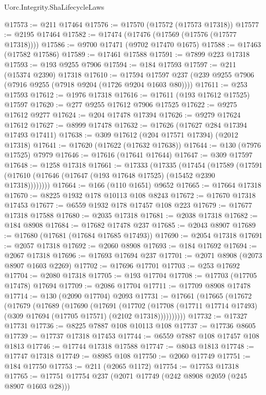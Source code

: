 \begin{lexlean}{Uorc.Integrity.ShaLifecycleLaws}
\begin{coremodule}
@17573 := @211 @17464
@17576 := @17570 (@17572 (@17573 @17318))
@17577 := @2195 @17464
@17582 := @17474 (@17476 (@17569 (@17576 (@17577 @17318))))
@17586 := @9700 @17471 (@9702 @17470 @1675)
@17588 := @17463 (@17582 @17586)
@17589 := @17461 @17588
@17591 := @7899 @223 @17318
@17593 := @193 @9255 @7906
@17594 := @184 @17593
@17597 := @211 (@15374 @2390) @17318
@17610 := @17594 @17597 @237 (@239 @9255 @7906 (@7916 @9255 (@7918 @9204 (@1726 @9204 @1603 @80))))
@17611 := @253 @17593
@17612 := @1976 @17318
@17616 := @17611 (@193 @17612 @17525) @17597
@17620 := @277 @9255 @17612 @7906 @17525
@17622 := @9275 @17612 @9277
@17624 := @204 @17478 @17394
@17626 := @9279 @17624 @17612
@17627 := @8999 @17478
@17632 := @17626 (@17627 @284 @17394 @17493 @17411)
@17638 := @309 @17612 (@204 @17571 @17394) (@2012 @17318)
@17641 := @17620 (@17622 (@17632 @17638))
@17644 := @130 (@7976 @17525) @7979
@17646 := @17616 (@17641 @17644)
@17647 := @309 @17597
@17648 := @1258 @17318
@17661 := @17333
    (@17335
      (@17454
        (@17589 (@17591 (@17610 (@17646 (@17647 (@193 @17648 @17525) (@15452 @2390 @17318))))))))
@17664 := @166 (@110 @1651) @9652
@17665 := @17664 @17318
@17670 := @8225 @1932 @178 @10113 @108 @8243
@17672 := @17670 @17318 @17453
@17677 := @6559 @1932 @178 @17457 @108 @223
@17679 := @17677 @17318 @17588
@17680 := @2035 @17318
@17681 := @2038 @17318
@17682 := @184 @8908
@17684 := @17682 @17478 @237
@17685 := @2043 @8907
@17689 := @17680 (@17681 (@17684 @17685 @17493))
@17690 := @2054 @17318
@17691 := @2057 @17318
@17692 := @2060 @8908
@17693 := @184 @17692
@17694 := @2067 @17318
@17696 := @17693 @17694 @237
@17701 := @2071 @8908 (@2073 @8907 @1603 @2269)
@17702 := @17696 @17701
@17703 := @253 @17692
@17704 := @2080 @17318
@17705 := @193 @17704
@17708 := @17703 (@17705 @17478) @17694
@17709 := @2086 @17704
@17711 := @17709 @8908 @17478
@17714 := @130 (@2090 @17704) @2093
@17731 := @17661
    (@17665
      (@17672
        (@17679
          (@17689
            (@17690
              (@17691
                (@17702
                  (@17708
                    (@17711 @17714 @17493)
                    (@309 @17694 (@17705 @17571) (@2102 @17318))))))))))
@17732 := @17327 @17731
@17736 := @8225 @7887 @108 @10113 @108
@17737 := @17736 @8605
@17739 := @17737 @17318 @17453
@17744 := @6559 @7887 @108 @17457 @108 @1813
@17746 := @17744 @17318 @17588
@17747 := @8043 @1813
@17748 := @17747 @17318
@17749 := @8985 @108
@17750 := @2060 @17749
@17751 := @184 @17750
@17753 := @211 (@2065 @1172)
@17754 := @17753 @17318
@17765 := @17751 @17754 @237 (@2071 @17749 (@242 @8908 @2059 (@245 @8907 @1603 @28)))

\end{coremodule}
\end{lexlean}
